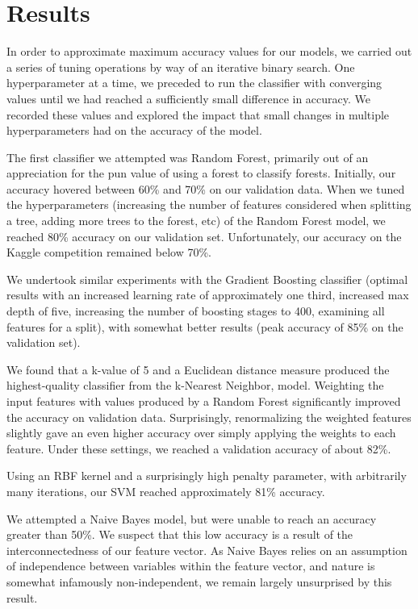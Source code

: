 \section{Results}
\label{sec:-res}
In order to approximate maximum accuracy values for our models, we 
carried out a series of tuning operations by way of an iterative binary 
search.  One hyperparameter at a time, we preceded to run the 
classifier with converging values until we had reached a sufficiently 
small difference in accuracy.  We recorded these values and explored 
the impact that small changes in multiple hyperparameters had on the 
accuracy of the model.  


The first classifier we attempted was Random Forest, primarily out of an 
appreciation for the pun value of using a forest to classify forests. 
Initially, our accuracy hovered between 60\% and 70\% on our validation 
data.  When we tuned the hyperparameters (increasing the number of 
features considered when splitting a tree, adding more trees to the 
forest, etc) of the Random Forest model, we reached 80\% accuracy on 
our validation set.  Unfortunately, our accuracy on the Kaggle 
competition remained below 70\%.  

We undertook similar experiments with the Gradient Boosting classifier 
(optimal results with an increased learning rate of approximately one 
third, increased max depth of five, increasing the number of boosting 
stages to 400, examining all features for a split), with somewhat 
better results (peak accuracy of 85\% on the validation set).  

We found that a k-value of 5 and a Euclidean distance measure
produced the highest-quality classifier from the k-Nearest Neighbor, 
model. Weighting the input features with values produced by a
Random Forest significantly improved the accuracy on validation data.
Surprisingly, renormalizing the weighted features slightly gave an even
higher accuracy over simply applying the weights to each feature.
Under these settings, we reached a validation accuracy of about 
82\%.

Using an RBF kernel and a surprisingly high penalty parameter, with 
arbitrarily many iterations, our SVM reached approximately 81\% 
accuracy.

We attempted a Naive Bayes model, but were unable to reach an accuracy 
greater than 50\%.  We suspect that this low accuracy is a result of 
the interconnectedness of our feature vector.  As Naive Bayes relies on 
an assumption of independence between variables within the feature 
vector, and nature is somewhat infamously non-independent\cite{silent}, 
we remain largely unsurprised by this result.

